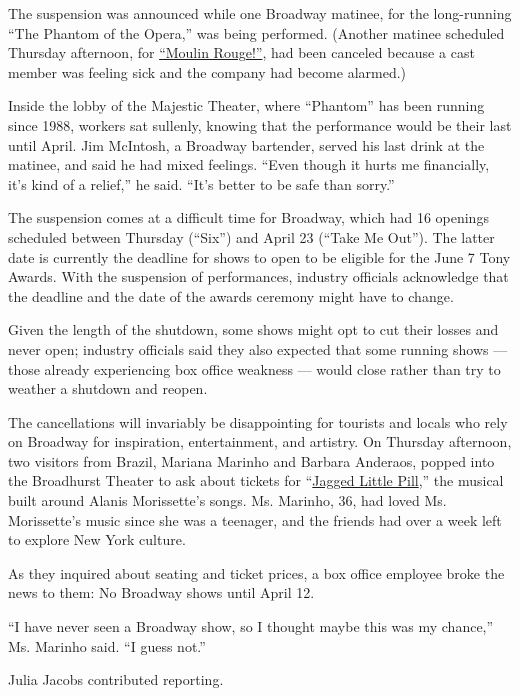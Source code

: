 The suspension was announced while one Broadway matinee, for the
long-running ``The Phantom of the Opera,'' was being performed. (Another
matinee scheduled Thursday afternoon, for
\href{https://www.nytimes3xbfgragh.onion/2019/07/25/theater/moulin-rouge-review.html?searchResultPosition=2}{``Moulin
Rouge!''}, had been canceled because a cast member was feeling sick and
the company had become alarmed.)

Inside the lobby of the Majestic Theater, where ``Phantom'' has been
running since 1988, workers sat sullenly, knowing that the performance
would be their last until April. Jim McIntosh, a Broadway bartender,
served his last drink at the matinee, and said he had mixed feelings.
``Even though it hurts me financially, it's kind of a relief,'' he said.
``It's better to be safe than sorry.''

The suspension comes at a difficult time for Broadway, which had 16
openings scheduled between Thursday (``Six'') and April 23 (``Take Me
Out''). The latter date is currently the deadline for shows to open to
be eligible for the June 7 Tony Awards. With the suspension of
performances, industry officials acknowledge that the deadline and the
date of the awards ceremony might have to change.

Given the length of the shutdown, some shows might opt to cut their
losses and never open; industry officials said they also expected that
some running shows --- those already experiencing box office weakness
--- would close rather than try to weather a shutdown and reopen.

The cancellations will invariably be disappointing for tourists and
locals who rely on Broadway for inspiration, entertainment, and
artistry. On Thursday afternoon, two visitors from Brazil, Mariana
Marinho and Barbara Anderaos, popped into the Broadhurst Theater to ask
about tickets for ``\href{https://nyti.ms/34UocKB}{Jagged Little
Pill},'' the musical built around Alanis Morissette's songs. Ms.
Marinho, 36, had loved Ms. Morissette's music since she was a teenager,
and the friends had over a week left to explore New York culture.

As they inquired about seating and ticket prices, a box office employee
broke the news to them: No Broadway shows until April 12.

``I have never seen a Broadway show, so I thought maybe this was my
chance,'' Ms. Marinho said. ``I guess not.''

Julia Jacobs contributed reporting.

